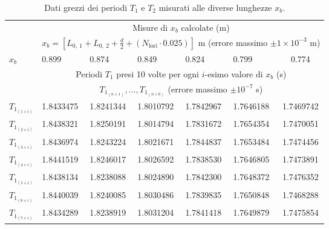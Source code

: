\begin{table*}[!p]
    \begin{ruledtabular}
        \caption{Dati grezzi dei periodi $T_1$ e $T_2$ misurati alle diverse lunghezze $x_b$.}
        \label{table:raw_data}
        \begin{tabular}{llllllc}
                                   & \multicolumn{6}{c}{Misure di $x_b$ calcolate (m)}                                                                                               \\
                                   & \multicolumn{6}{c}{$x_b=\left[L_{0,~1} + L_{0,~2} + \frac{d}{2} + (N_{\text{fori}}\cdot0.025)\right]$ m (errore massimo $\pm1\times10^{-3}$ m)} \\
            \colrule
            $x_b$                  & 0.899     & 0.874              & 0.849              & 0.824     & 0.799     & 0.774    \\\colrule
                                   & \multicolumn{6}{c}{Periodi $T_1$ presi 10 volte per ogni $i$-esimo valore di $x_b$ (s)}\\
                                   & \multicolumn{6}{c}{$T_{1_{(n \times 1)}}, \ldots, T_{1_{(n \times 6)}}$ (errore massimo $\pm10^{-7}$ s)} \\
            \colrule
            $T_{1_{(1 \times i)}}$ & 1.8433475 & 1.8241344          & 1.8010792          & 1.7842967 & 1.7646188 & 1.7469742                  \\
            $T_{1_{(2 \times i)}}$ & 1.8438321 & 1.8250191          & 1.8014794          & 1.7831672 & 1.7654354 & 1.7470051                  \\
            $T_{1_{(3 \times i)}}$ & 1.8436974 & 1.8243224          & 1.8021671          & 1.7844837 & 1.7653484 & 1.7474456                  \\
            $T_{1_{(4 \times i)}}$ & 1.8441519 & 1.8246017          & 1.8026592          & 1.7838530 & 1.7646805 & 1.7473891                  \\
            $T_{1_{(5 \times i)}}$ & 1.8438134 & 1.8238088          & 1.8024890          & 1.7842300 & 1.7648372 & 1.7476352                  \\
            $T_{1_{(6 \times i)}}$ & 1.8440039 & 1.8240085          & 1.8030486          & 1.7839835 & 1.7650848 & 1.7468288                  \\
            $T_{1_{(7 \times i)}}$ & 1.8434289 & 1.8238919          & 1.8031204          & 1.7841418 & 1.7649879 & 1.7475854                  \\

\end{tabular}
\end{ruledtabular}
\end{table*}
